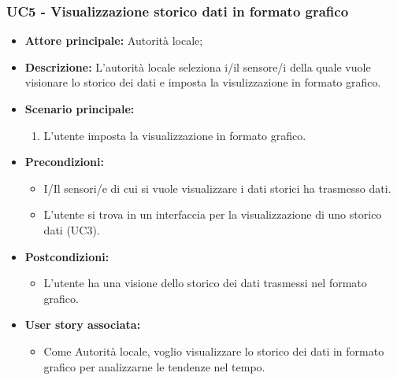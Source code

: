 \documentclass{article}
\begin{document}
\subsubsection{UC5 - Visualizzazione storico dati in formato grafico}
\begin{itemize}
    \item \textbf{Attore principale:} Autorità locale;
    \item \textbf{Descrizione:} L’autorità locale seleziona i/il sensore/i della quale vuole visionare lo storico dei dati e imposta la visulizzazione in formato grafico.
    \item \textbf{Scenario principale:}
          \begin{enumerate}
              \item L'utente imposta la visualizzazione in formato grafico.
          \end{enumerate}
    \item \textbf{Precondizioni:}
          \begin{itemize}
              \item  I/Il sensori/e di cui si vuole visualizzare i dati storici ha trasmesso dati.
              \item  L'utente si trova in un interfaccia per la visualizzazione di uno storico dati (UC3).
          \end{itemize}
    \item \textbf{Postcondizioni:}
          \begin{itemize}
              \item  L'utente ha una visione dello storico dei dati trasmessi nel formato grafico.
          \end{itemize}
    \item \textbf{User story associata:}
          \begin{itemize}
              \item Come Autorità locale, voglio visualizzare lo storico dei dati in formato grafico per analizzarne le tendenze nel tempo.
          \end{itemize}
\end{itemize}
\end{document}
